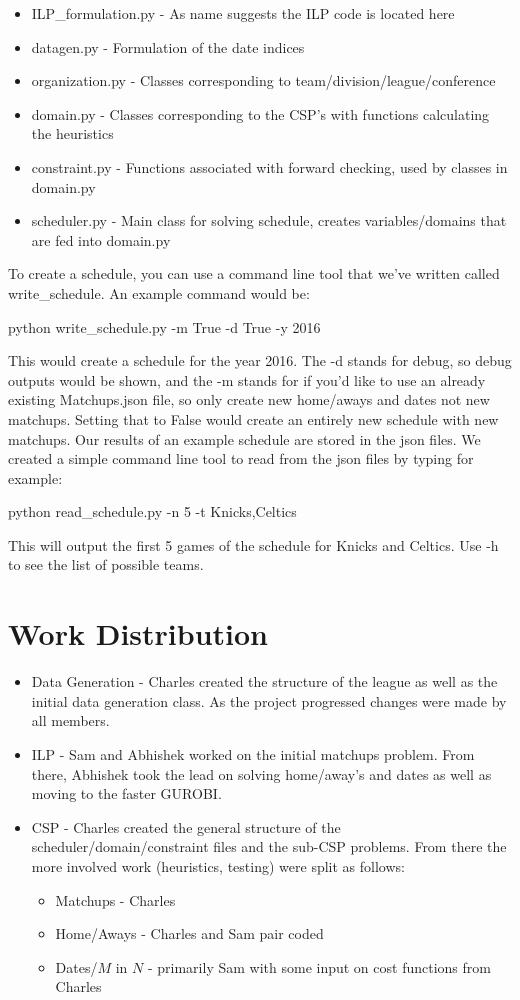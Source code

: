 \documentclass{article}
\begin{document}
	\begin{itemize}
		\item ILP\_formulation.py - As name suggests the ILP code is located here
		\item datagen.py - Formulation of the date indices
		\item organization.py - Classes corresponding to team/division/league/conference
		\item domain.py - Classes corresponding to the CSP's with functions calculating the heuristics
		\item constraint.py - Functions associated with forward checking, used by classes in domain.py
		\item scheduler.py - Main class for solving schedule, creates variables/domains that are fed into domain.py
	\end{itemize}
	To create a schedule, you can use a command line tool that we've written called write\_schedule. An example command would be:
	\begin{center}
		python write\_schedule.py -m True -d True -y 2016
	\end{center}
	This would create a schedule for the year 2016. The -d stands for debug, so debug outputs would be shown, and the -m stands for if you'd like to use an already existing Matchups.json file, so only create new home/aways and dates not new matchups. Setting that to False would create an entirely new schedule with new matchups.
	Our results of an example schedule are stored in the json files. We created a simple command line tool to read from the json files by typing for example:
	\begin{center}
		python read\_schedule.py -n 5 -t Knicks,Celtics
	\end{center}
	This will output the first 5 games of the schedule for Knicks and Celtics. Use -h to see the list of possible teams.

	\section{Work Distribution}
	\begin{itemize}
	\item Data Generation - Charles created the structure of the league as well as the initial data generation class. As the project progressed changes were made by all members.
	\item ILP - Sam and Abhishek worked on the initial matchups problem. From there, Abhishek took the lead on solving home/away's and dates as well as moving to the faster GUROBI.
	\item CSP - Charles created the general structure of the scheduler/domain/constraint files and the sub-CSP problems. From there the more involved work (heuristics, testing) were split as follows:
		\begin{itemize}
			\item Matchups - Charles
			\item Home/Aways - Charles and Sam pair coded
			\item Dates/$M$ in $N$ - primarily Sam with some input on cost functions from Charles
		\end{itemize}
	\end{itemize}
\end{document}
